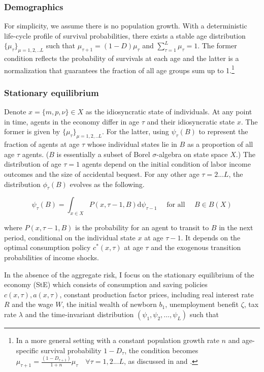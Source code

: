 \subsubsection{Demographics}

For simplicity, we assume there is no population growth. With a deterministic life-cycle profile of survival probabilities, there exists a stable age distribution $\{\mu_\tau \}_{\mu=1,2,..L}$ such that $\mu_{\tau+1} = (1-D)\mu_{\tau}$ and $\sum^{L}_{\tau=1}\mu_{\tau} = 1$. The former condition reflects the probability of survivals at each age and the latter is a normalization that guarantees the fraction of all age groups sum up to 1.\footnote{In a more general setting with a constant population growth rate $n$ and age-specific survival probability $1-D_\tau$, the condition becomes $\mu_{\tau+1} = \frac{(1-D_{\tau+1})}{1+n}\mu_{\tau}\quad \forall \tau = 1, 2...L$, as discussed in \cite{rios1996life} and \cite{huggett1996wealth}.}

\subsubsection{Stationary equilibrium}

Denote $x= \{m,p,\nu \} \in X$  as the idiosyncratic state of individuals. At any point in time, agents in the economy differ in age $\tau$ and their idiosyncratic state $x$. The former is given by $\{\mu_\tau \}_{\mu=1,2,..L}$. For the latter, using $\psi_\tau(B)$ to represent the fraction of agents at age $\tau$ whose individual states lie in $B$ as a proportion of all age $\tau$ agents. ($B$ is essentially a subset of Borel $\sigma$-algebra on state space $X$.) The distribution of age $\tau=1$ agents depend on the initial condition of labor income outcomes and the size of accidental bequest. For any other age $\tau=2...L$, the distribution $\phi_\tau(B)$ evolves as the following.

\begin{equation}
\label{Eq:DistDyn}
\psi_{\tau}(B)=\int_{x \in X} P(x, \tau-1, B) \mathrm{d} \psi_{\tau-1} \quad \text { for all } \quad B \in B(X)
\end{equation}

where $P(x,\tau-1,B)$ is the probability for an agent to transit to $B$ in the next period, conditional on the individual state $x$ at age $\tau-1$. It depends on the optimal consumption policy $c^*(x,\tau)$ at age $\tau$ and the exogenous transition probabilities of income shocks. 

In the absence of the aggregate risk, I focus on the stationary equilibrium of the economy (StE) which consists of consumption and saving policies $c(x,\tau), a(x, \tau)$, constant production factor prices, including real interest rate $R$ and the wage $W$, the initial wealth of newborn $b_1$, unemployment benefit $\zeta$, tax rate $\lambda$ and the time-invariant distribution $\left(\psi_{1}, \psi_{2}, \ldots, \psi_{L}\right)$ such that

